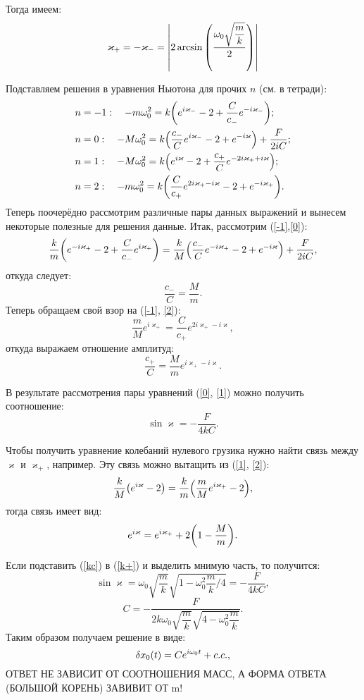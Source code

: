 \documentclass[a4paper,russian]{article}
\renewcommand{\kappa}{\varkappa}
\begin{document}
Тогда имеем:
\begin{equation}\label{k}
	\kappa_+ = - \kappa_-= \abs{2 \arcsin\qty(\frac{\omega_0\sqrt{\dfrac{m}{k}}}{2})}
\end{equation}
\par
Подставляем решения в уравнения Ньютона для прочих $n$ (см.
в тетради):
\begin{align}
 & n=-1:\quad -m\omega_0^2=k\qty(e^{i\kappa_-}-2+ 
 \dfrac{C}{c_-}e^{-i\kappa_-});\label{-1}\\
 & n=0:\quad -M\omega_0^2=k\qty(\dfrac{c_-}{C}e^{i\kappa_-}-2 
 +e^{-i\kappa})+\dfrac{F}{2iC};\label{0}\\
 & n=1:\quad -M\omega_0^2=k\qty(e^{i\kappa}-2+\dfrac{c_+}{C}
 e^{-2i\kappa_+ + i\kappa});\label{1}\\
 & n=2:\quad -m\omega_0^2=k\qty(\dfrac{C}{c_+}e^{2i\kappa_+-i\kappa} 
 -2+e^{-i\kappa_+}).\label{2}
\end{align}
Теперь поочерёдно рассмотрим различные пары данных выражений
и вынесем некоторые полезные для решения данные. Итак,
рассмотрим (\ref{-1},\ref{0}):
\[
\dfrac{k}{m}\qty(e^{-i\kappa_+}-2+\dfrac{C}{c_-}e^{i\kappa_+})=
\dfrac{k}{M}\qty(\dfrac{c_-}{C}e^{-i\kappa_+}-2+e^{-i\kappa})+\dfrac{F}{2iC}
,\]
откуда следует:
\begin{equation}\label{c-}
\dfrac{c_-}{C}=\dfrac{M}{m}.
\end{equation}
Теперь обращаем свой взор на (\ref{-1}, \ref{2}):
\[
\dfrac{m}{M}e^{i\kappa_+}=\dfrac{C}{c_+}e^{2i\kappa_+ - i\kappa}
,\] откуда выражаем отношение амплитуд:
\begin{equation}\label{c+}
\dfrac{c_+}{C}=\dfrac{M}{m}e^{i\kappa_+ -i\kappa}
.\end{equation}

В результате рассмотрения пары уравнений (\ref{0}, \ref{1}) можно получить соотношение:
\begin{equation}\label{kc}
	\sin{\kappa}=-\dfrac{F}{4kC}
.\end{equation}

Чтобы получить уравнение колебаний нулевого грузика 
нужно найти связь между $\kappa$ и  $\kappa_+$, например. 
Эту связь можно вытащить из (\ref{1}, \ref{2}):
\[
\dfrac{k}{M}\qty(e^{i\kappa}-2)=\dfrac{k}{m}\qty(\dfrac{m}{M}e^{i\kappa_+}-2)
,\]
тогда связь имеет вид:
\begin{equation}\label{k+}
e^{i\kappa}=e^{i\kappa_+}+2\qty(1-\dfrac{M}{m})
.\end{equation}

Если подставить (\ref{kc}) в (\ref{k+}) и выделить мнимую часть, то получится:
\begin{equation*}
	\sin{\kappa}=\omega_0\sqrt{\dfrac{m}{k}}\sqrt{1-{\omega_0^2 \dfrac{m}{k}}/4}=-\dfrac{F}{4kC}
,\end{equation*}
\begin{equation}\label{C_fin}
	C=-\dfrac{F}{2k\omega_0\sqrt{\dfrac{m}{k}}\sqrt{4-\omega_0^2\dfrac{m}{k}}}.
\end{equation}
Таким образом получаем решение в виде:
\[
\delta x_0\qty(t)=C e^{i\omega_0t}+c.c.
,\] 
\Huge{ОТВЕТ НЕ ЗАВИСИТ ОТ СООТНОШЕНИЯ МАСС, А ФОРМА ОТВЕТА (БОЛЬШОЙ КОРЕНЬ) ЗАВИВИТ ОТ 	m!}
\end{document}
